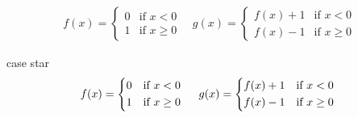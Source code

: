 \documentclass[12pt,english]{article}
\begin{document}
\begin{align}
f(x) = \begin{cases}
             0  & \text{if } x < 0 \\
             1  & \text{if } x \ge 0
       \end{cases} \quad
g(x) = \begin{cases}
             f(x)+1  & \text{if } x < 0 \\
             f(x)-1  & \text{if } x \ge 0
       \end{cases}
\end{align}

case star
\begin{align}
f(x) =
\begin{cases*}
0  & if $x < 0$ \\
1  & if $x \ge 0$
\end{cases*}
\quad
g(x) =
\begin{cases*}
f(x)+1  & if $ x < 0$ \\
f(x)-1  & if $ x \ge 0$
\end{cases*}
\end{align}

\pagebreak
\end{document}
